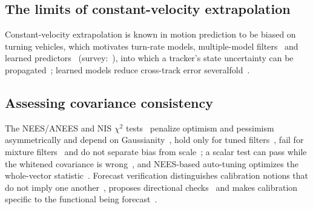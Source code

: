 \documentclass{ieeeaccess}
\begin{document}
\subsection{The limits of constant-velocity extrapolation}
Constant-velocity extrapolation is known in motion prediction to be biased on turning vehicles, which motivates turn-rate models, multiple-model filters~\cite{BlomBarShalom1988,Mazor1998,BarthFranke2010} and learned predictors~\cite{Djuric2020,PhanMinh2020} (survey:~\cite{Lefevre2014}), into which a tracker's state uncertainty can be propagated~\cite{Ivanovic2022}; learned models reduce cross-track error severalfold~\cite{Djuric2020}.

\subsection{Assessing covariance consistency}
The NEES/ANEES and NIS $\chi^{2}$ tests~\cite{BarShalom2001} penalize optimism and pessimism asymmetrically and depend on Gaussianity~\cite{Li2002}, hold only for tuned filters~\cite{Chen2024}, fail for mixture filters~\cite{Ahmed2024} and do not separate bias from scale~\cite{Yan2026}; a scalar test can pass while the whitened covariance is wrong~\cite{Forsling2025}, and NEES-based auto-tuning optimizes the whole-vector statistic~\cite{Chen2018nees}. Forecast verification distinguishes calibration notions that do not imply one another~\cite{Gneiting2007}, proposes directional checks~\cite{Ziegel2014} and makes calibration specific to the functional being forecast~\cite{GneitingResin2023}.
\end{document}
